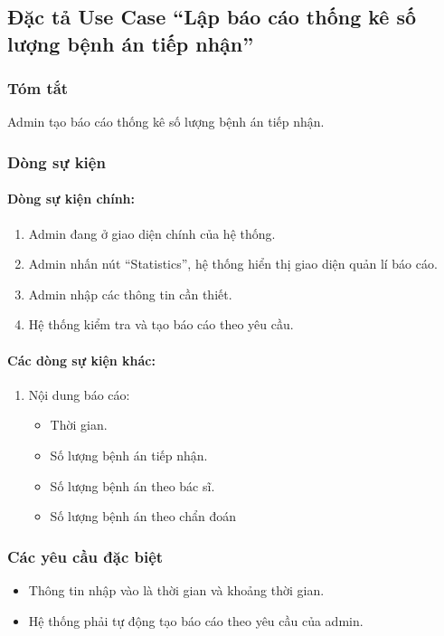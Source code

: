 \subsection{Đặc tả Use Case ``Lập báo cáo thống kê số lượng bệnh án tiếp nhận''}

\subsubsection{Tóm tắt}
Admin tạo báo cáo thống kê số lượng bệnh án tiếp nhận.

\subsubsection{Dòng sự kiện}
\paragraph{\textbf{Dòng sự kiện chính:}}
\begin{enumerate}
  \item Admin đang ở giao diện chính của hệ thống.
  \item Admin nhấn nút ``Statistics'', hệ thống hiển thị giao diện quản lí báo cáo.
  \item Admin nhập các thông tin cần thiết.
  \item Hệ thống kiểm tra và tạo báo cáo theo yêu cầu.
\end{enumerate}

\paragraph{\textbf{Các dòng sự kiện khác:}}
\begin{enumerate}
  \item Nội dung báo cáo:
    \begin{itemize}
      \item Thời gian.
      \item Số lượng bệnh án tiếp nhận.
      \item Số lượng bệnh án theo bác sĩ.
      \item Số lượng bệnh án theo chẩn đoán
    \end{itemize}
\end{enumerate}

\subsubsection{Các yêu cầu đặc biệt}
\begin{itemize}
  \item Thông tin nhập vào là thời gian và khoảng thời gian.
  \item Hệ thống phải tự động tạo báo cáo theo yêu cầu của admin.
\end{itemize}

